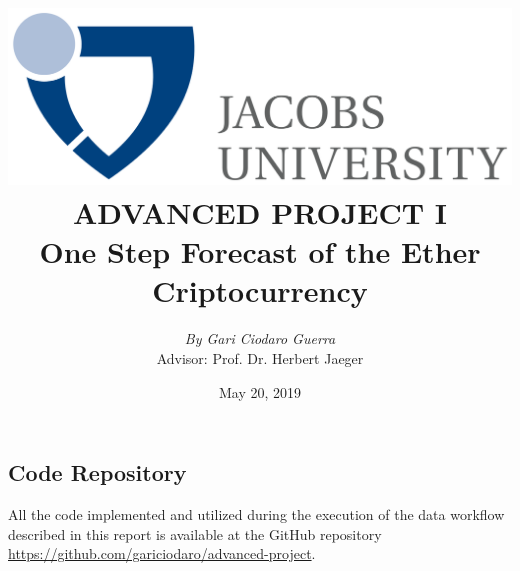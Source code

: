 \documentclass{article}
\title{
    {\includegraphics[scale=0.15]{logo-black.png}} \\
    \vspace{1.4cm}
    {\large \textbf{ADVANCED PROJECT I}} \\
    {\large \textbf{One Step Forecast of the Ether Criptocurrency}} \\
}
\author{\textit{By Gari Ciodaro Guerra}\\[0.2cm]{\small Advisor: Prof. Dr. Herbert Jaeger}}
\date{May 20, 2019}
\begin{document}
\maketitle


\newpage





\clearpage
\appendix
\begin{appendices}
\section{Code Repository}

All the code implemented and utilized during the execution of the data workflow
described in this report is available at the GitHub repository \href{https://github.com/gariciodaro/advanced-project}{https://github.com/gariciodaro/advanced-project}.

\end{appendices}

\clearpage
\newpage
\printbibliography
\end{document}
